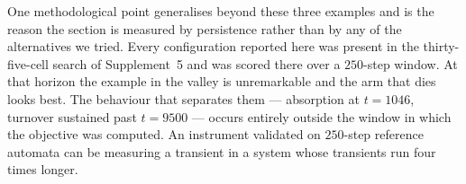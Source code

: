 One methodological point generalises beyond these three examples and is the
reason the section is measured by persistence rather than by any of the
alternatives we tried. Every configuration reported here was present in the
thirty-five-cell search of Supplement~5 and was scored there over a $250$-step
window. At that horizon the example in the valley is unremarkable and the arm
that dies looks best. The behaviour that separates them --- absorption at
$t = 1046$, turnover sustained past $t = 9500$ --- occurs entirely outside the
window in which the objective was computed. An instrument validated on
$250$-step reference automata can be measuring a transient in a system whose
transients run four times longer.
